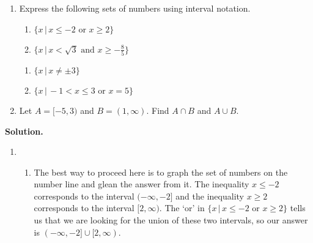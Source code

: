 \begin{ex} \label{intervalex} $~$

\begin{enumerate} \item Express the following sets of numbers using interval notation.

\begin{multicols}{2}

\begin{enumerate}

\item  $\{ x \, | \, x \leq -2 \, \, \text{or} \, \,  x \geq 2 \}$

\item  $\{ x \, | \, x < \sqrt{3} \,\,  \text{and} \,\, x \geq -\frac{8}{5}  \}$

\setcounter{HW}{\value{enumii}}

\end{enumerate}

\end{multicols}

\begin{multicols}{2}

\begin{enumerate}

\setcounter{enumii}{\value{HW}}

\item  $\{ x \, | \, x \neq \pm 3 \}$

\item  $\{ x \, | \, -1 < x \leq 3 \,\, \text{or} \,\, x = 5\}$

\end{enumerate}

\end{multicols}

\item  Let $A = [-5,3)$ and $B = (1, \infty)$.  Find  $A \cap B$ and $A\cup B$. 

\end{enumerate}


{\bf Solution.}

\begin{enumerate}

\item 

\begin{enumerate}

\item  The best way to proceed here is to graph the set of numbers on the number line and glean the answer from it.  The inequality $x \leq -2$ corresponds to the interval $(-\infty, -2]$ and the inequality $x \geq 2$ corresponds to the interval $[2, \infty)$. The `or' in $\{ x \, | \, x \leq -2 \, \, \text{or} \, \,  x \geq 2 \}$ tells us that we are looking for the union of these two intervals, so our answer is $(-\infty, -2] \cup [2, \infty)$.


\end{enumerate}
\end{enumerate}
\end{ex}
